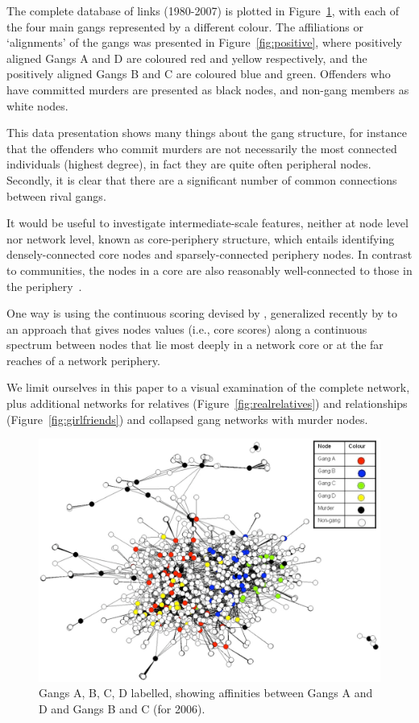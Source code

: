 \documentclass[twocolumn]{svjour3}          %
\theoremstyle{definition}
\begin{document}
The complete database of links (1980-2007) is plotted in
Figure~\ref{fig:legend2006}, with each of the four main gangs
represented by a different colour. The affiliations or `alignments' of
the gangs was presented in Figure~\ref{fig:positive}, where positively
aligned Gangs A and D are coloured red and yellow respectively, and
the positively aligned Gangs B and C are coloured blue and
green. Offenders who have committed murders are presented as black
nodes, and non-gang members as white nodes.

This data presentation shows many things about the gang structure, for
instance that the offenders who commit murders are not necessarily the
most connected individuals (highest degree), in fact they are quite
often peripheral nodes. Secondly, it is clear that there are a
significant number of common connections between rival gangs.

It would be useful to investigate intermediate-scale features, neither
at node level nor network level, known as core-periphery structure,
which entails identifying densely-connected core nodes and
sparsely-connected periphery nodes. In contrast to communities, the
nodes in a core are also reasonably well-connected to those in the
periphery~\citep{rombach-et-al:2014}.

One way is using the continuous scoring devised by
\citet{borgatti+everett:2000}, generalized recently by
\citet{rombach-et-al:2014} to an approach that gives nodes values
(i.e., core scores) along a continuous spectrum between nodes that lie
most deeply in a network core or at the far reaches of a network
periphery.

We limit ourselves in this paper to a visual examination of the
complete network, plus additional networks for relatives
(Figure~\ref{fig:realrelatives}) and relationships
(Figure~\ref{fig:girlfriends}) and collapsed gang networks with murder
nodes.


\begin{figure}[htb]
\centering
\includegraphics[width=\columnwidth]{images/legend2006}
\caption{Gangs A, B, C, D labelled, showing affinities between Gangs A
  and D and Gangs B and C (for 2006).}
\label{fig:legend2006} 
\end{figure}
\end{document}
